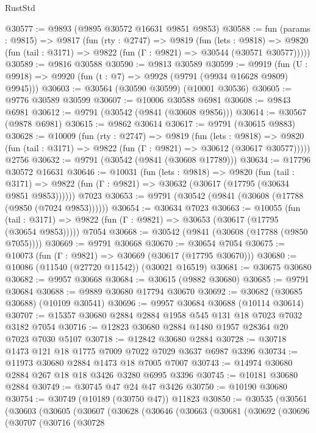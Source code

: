 \begin{lexlean}{RustStd}
\begin{coremodule}
@30577 := @9893 (@9895 @30572 @16631 @9851 @9853)
@30588 := fun (params : @9815) =>
  @9817
    (fun (rty : @2747) =>
    @9819
      (fun (lets : @9818) =>
      @9820 (fun (tail : @3171) => @9822 (fun (Γ : @9821) => @30544 (@30571 @30577)))))
@30589 := @9816 @30588
@30590 := @9813 @30589
@30599 := @9919
    (fun (U : @9918) => @9920 (fun (t : @7) => @9928 (@9791 (@9934 @16628 @9809) @9945)))
@30603 := @30564 (@30590 @30599) (@10001 @30536)
@30605 := @9776 @30589 @30599
@30607 := @10006 @30588 @6981
@30608 := @9843 @6981
@30612 := @9791 (@30542 (@9841 (@30608 @9856)))
@30614 := @30567 (@9878 @6981)
@30615 := @9862 @30614
@30617 := @9791 (@30615 @9883)
@30628 := @10009
    (fun (rty : @2747) =>
    @9819
      (fun (lets : @9818) =>
      @9820 (fun (tail : @3171) => @9822 (fun (Γ : @9821) => @30612 (@30617 @30577)))))
    @2756
@30632 := @9791 (@30542 (@9841 (@30608 @17789)))
@30634 := @17796 @30572 @16631
@30646 := @10031
    (fun (lets : @9818) =>
    @9820
      (fun (tail : @3171) =>
      @9822 (fun (Γ : @9821) => @30632 (@30617 (@17795 (@30634 @9851 @9853))))))
    @7023
@30653 := @9791 (@30542 (@9841 (@30608 (@17788 (@9850 (@7024 @9853))))))
@30654 := @30634 @7023
@30663 := @10055
    (fun (tail : @3171) => @9822 (fun (Γ : @9821) => @30653 (@30617 (@17795 (@30654 @9853)))))
    @7054
@30668 := @30542 (@9841 (@30608 (@17788 (@9850 @7055))))
@30669 := @9791 @30668
@30670 := @30654 @7054
@30675 := @10073 (fun (Γ : @9821) => @30669 (@30617 (@17795 @30670)))
@30680 := @10086 (@11540 (@27720 @11542)) (@30021 @16519)
@30681 := @30675 @30680
@30682 := @9957 @30668
@30684 := @30615 (@9882 @30680)
@30685 := @9791 @30684
@30688 := @9889 @30680 @17794 @30670
@30692 := @30682 (@30685 @30688) (@10109 @30541)
@30696 := @9957 @30684 @30688 (@10114 @30614)
@30707 := @15357 @30680 @2884 @2884 @1958 @545 @131 @18 @7023 @7032 @3182 @7054
@30716 := @12823 @30680 @2884 @1480 @1957 @28364 @20 @7023 @7030 @5107
@30718 := @12842 @30680 @2884
@30728 := @30718 @1473 @121 @18 @1775 @7009 @7022 @7029 @3637 @6987 @3396
@30734 := @11973 @30680 @2884 @1473 @18 @7005 @7007
@30743 := @14974 @30680 @2884 @267 @18 @18 @3426 @3280 @6995 @3396
@30745 := @10181 @30680 @2884
@30749 := @30745 @47 @24 @47 @3426
@30750 := @10190 @30680
@30754 := @30749 (@10189 (@30750 @47)) @11823
@30850 := @30535
    (@30561
      (@30603
        (@30605
          (@30607
            (@30628
              (@30646
                (@30663
                  (@30681
                    (@30692
                      (@30696
                        (@30707
                          (@30716
                            (@30728

\end{coremodule}
\end{lexlean}
